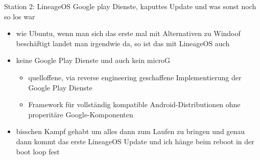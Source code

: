 \documentclass[14pt,compress,usenames,dvipsnames,aspectratio=169]{beamer}
\begin{document}
\begin{frame}{Station 2: LineageOS}
    Google play Dienste, kaputtes Update und was sonst noch so los war
    \begin{itemize}
        \item wie Ubuntu, wenn man sich das erste mal mit Alternativen zu Windoof beschäftigt landet man irgendwie da, so ist das mit LineageOS auch 
        \item keine Google Play Dienste und auch kein microG
        \begin{itemize}
            \item quelloffene, via reverse engineering geschaffene Implementierung der Google Play Dienste 
            \item Framework für vollständig kompatible Android-Distributionen ohne properitäre Google-Komponenten
        \end{itemize}
        \item bisschen Kampf gehabt um alles dann zum Laufen zu bringen und genau dann kommt das erste LineageOS Update und ich hänge beim reboot in der boot loop fest
    \end{itemize}


\end{frame}
\end{document}
